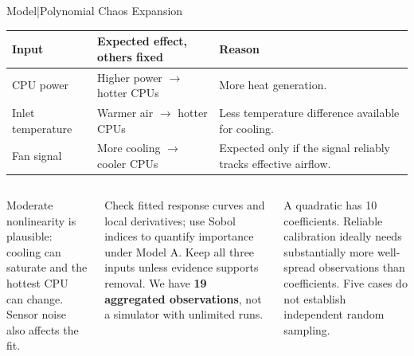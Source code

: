 \begin{frame}{Model\enspace|\enspace Polynomial Chaos Expansion}
  {\footnotesize
  \renewcommand{\arraystretch}{1.3}
  \begin{tabular}{@{}p{}p{}p{}@{}}
    \toprule
    \textbf{Input} & \textbf{Expected effect, others fixed} & \textbf{Reason}\\
    \midrule
    CPU power & Higher power $\rightarrow$ hotter CPUs & More heat generation.\\
    Inlet temperature & Warmer air $\rightarrow$ hotter CPUs & Less temperature difference available for cooling.\\
    Fan signal & More cooling $\rightarrow$ cooler CPUs & Expected only if the signal reliably tracks effective airflow.\\
    \bottomrule
  \end{tabular}
  }
  \medskip
  \begin{columns}[T,onlytextwidth]
      \footnotesize
      Moderate nonlinearity is plausible: cooling can saturate and the hottest
      CPU can change. Sensor noise also affects the fit.\par
      \smallskip
      Check fitted response curves and local derivatives; use Sobol indices to
      quantify importance under Model A. Keep all three inputs unless evidence supports removal.
      \footnotesize
      We have \textbf{19 aggregated observations}, not a simulator with unlimited runs.\par
      \smallskip
      A quadratic has 10 coefficients. Reliable calibration ideally needs
      substantially more well-spread observations than coefficients.
      Five cases do not establish independent random sampling.
  \end{columns}
\end{frame}

